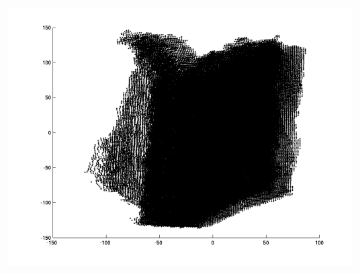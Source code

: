 \begin{figure}[H]
\begin{subfigure}[b]{0.3\textwidth}
		\includegraphics[width=\textwidth]{Images/Book12.png}
		\caption{}
	\end{subfigure}	
	

\end{figure}
